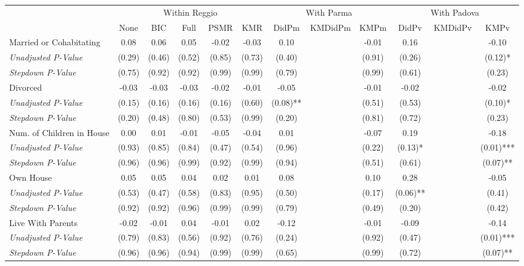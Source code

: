 \begin{tabular}{l c c c c c c c c c c c}
\toprule
& \multicolumn{5}{c}{Within Reggio} & \multicolumn{3}{c}{With Parma} & \multicolumn{3}{c}{With Padova} \\\cmidrule(lr){2-6} \cmidrule(lr){7-9} \cmidrule(lr){10-12}
 & None & BIC & Full & PSMR & KMR & DidPm & KMDidPm & KMPm & DidPv & KMDidPv & KMPv \\
\midrule
Married or Cohabitating & 0.08 & 0.06 & 0.05 & -0.02 & -0.03 & 0.10 & & -0.01 & 0.16 & & -0.10 \\
\quad \textit{Unadjusted P-Value} & (0.29) & (0.46) & (0.52) & (0.85) & (0.73) & (0.40) & & (0.91) & (0.26) & & (0.12)* \\
\quad \textit{Stepdown P-Value} & (0.75) & (0.92) & (0.92) & (0.99) & (0.99) & (0.79) & & (0.99) & (0.61) & & (0.23) \\
Divorced & -0.03 & -0.03 & -0.03 & -0.02 & -0.01 & -0.05 & & -0.01 & -0.02 & & -0.02 \\
\quad \textit{Unadjusted P-Value} & (0.15) & (0.16) & (0.16) & (0.16) & (0.60) & (0.08)** & & (0.51) & (0.53) & & (0.10)* \\
\quad \textit{Stepdown P-Value} & (0.20) & (0.48) & (0.80) & (0.53) & (0.99) & (0.20) & & (0.81) & (0.72) & & (0.23) \\
Num. of Children in House & 0.00 & 0.01 & -0.01 & -0.05 & -0.04 & 0.01 & & -0.07 & 0.19 & & -0.18 \\
\quad \textit{Unadjusted P-Value} & (0.93) & (0.85) & (0.84) & (0.47) & (0.54) & (0.96) & & (0.22) & (0.13)* & & (0.01)*** \\
\quad \textit{Stepdown P-Value} & (0.96) & (0.96) & (0.99) & (0.92) & (0.99) & (0.94) & & (0.51) & (0.61) & & (0.07)** \\
Own House & 0.05 & 0.05 & 0.04 & 0.02 & 0.01 & 0.08 & & 0.10 & 0.28 & & -0.05 \\
\quad \textit{Unadjusted P-Value} & (0.53) & (0.47) & (0.58) & (0.83) & (0.95) & (0.50) & & (0.17) & (0.06)** & & (0.41) \\
\quad \textit{Stepdown P-Value} & (0.92) & (0.92) & (0.96) & (0.99) & (0.99) & (0.79) & & (0.49) & (0.20) & & (0.42) \\
Live With Parents & -0.02 & -0.01 & 0.04 & -0.01 & 0.02 & -0.12 & & -0.01 & -0.09 & & -0.14 \\
\quad \textit{Unadjusted P-Value} & (0.79) & (0.83) & (0.56) & (0.92) & (0.76) & (0.24) & & (0.92) & (0.47) & & (0.01)*** \\
\quad \textit{Stepdown P-Value} & (0.96) & (0.96) & (0.94) & (0.99) & (0.99) & (0.65) & & (0.99) & (0.72) & & (0.07)** \\
\bottomrule
\end{tabular}

